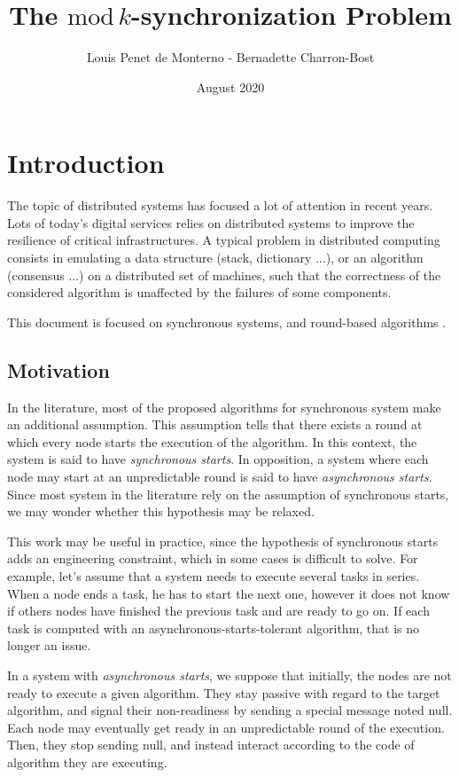 \documentclass{article}
\title{The $\mathrm{mod}\,k$-synchronization Problem}
\date{August 2020}
\author{Louis Penet de Monterno - Bernadette Charron-Bost}
\begin{document}
\maketitle
\tableofcontents

\section{Introduction}

The topic of distributed systems has focused a lot of attention in recent years.
Lots of today's digital services relies on distributed systems to improve the resilience of critical infrastructures.
A typical problem in distributed computing consists in emulating a data structure (stack, dictionary ...), or an algorithm (consensus ...) on a distributed
set of machines, such that the correctness of the considered algorithm is unaffected by the failures of some components.

This document is focused on synchronous systems, and round-based algorithms \cite{closed_communic}.

\subsection{Motivation}

In the literature, most of the proposed algorithms for synchronous system make an additional assumption.
This assumption tells that there exists a round at which every node starts the execution of the algorithm.
In this context, the system is said to have \emph{synchronous starts}.
In opposition, a system where each node may start at an unpredictable round is said to have \emph{asynchronous starts}.
Since most system in the literature rely on the assumption of synchronous starts, we may wonder whether this hypothesis may be relaxed.

This work may be useful in practice, since the hypothesis of synchronous starts adds an engineering constraint, which in some cases is difficult to solve.
For example, let's assume that a system needs to execute several tasks in series.
When a node ends a task, he has to start the next one, however it does not know if others nodes have finished the previous task and are ready to go on.
If each task is computed with an asynchronous-starts-tolerant algorithm, that is no longer an issue.

In a system with \textit{asynchronous starts}, we suppose that initially, the nodes are not ready to execute a given algorithm. They stay passive with regard to the target algorithm, 
and signal their non-readiness by sending a special message noted null. Each node may eventually get ready in an unpredictable round of the execution.
Then, they stop sending null, and instead interact according to the code of algorithm they are executing.
\end{document}
